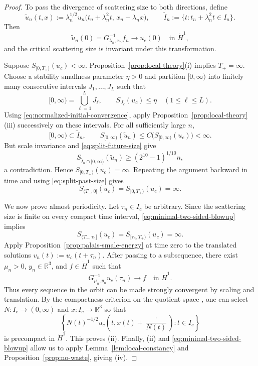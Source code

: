 \documentclass{interact}
\numberwithin{equation}{section}
\theoremstyle{plain}
\theoremstyle{definition}
\theoremstyle{remark}
\newcommand{\R}{\mathbb R}
\begin{document}
\begin{proof}
To pass the divergence of scattering size to both directions, define
\[
 \widetilde u_n(t,x)
 :=\lambda_n^{1/2}
 u_n\bigl(t_n+\lambda_n^2t,\,x_n+\lambda_n x\bigr),
 \qquad
 \widetilde I_n
 :=\{t:t_n+\lambda_n^2t\in I_n\}.
\]
Then
\begin{equation}\label{eq:normalized-initial-convergence}
 \widetilde u_n(0)=G_{\lambda_n,x_n}^{-1}f_n
 \longrightarrow u_c(0)
 \quad\text{in }\dot H^1,
\end{equation}
and the critical scattering size is invariant under this transformation.

Suppose $S_{[0,T_+)}(u_c)<\infty$. Proposition~\ref{prop:local-theory}(i) implies $T_+=\infty$. Choose a stability smallness parameter $\eta>0$ and partition $[0,\infty)$ into finitely many consecutive intervals $J_1,\dots,J_L$ such that
\[
 [0,\infty)=\bigcup_{\ell=1}^LJ_\ell,
 \qquad
 S_{J_\ell}(u_c)\le\eta
 \quad(1\le\ell\le L).
\]
Using \eqref{eq:normalized-initial-convergence}, apply Proposition~\ref{prop:local-theory}(iii) successively on these intervals. For all sufficiently large $n$,
\[
 [0,\infty)\subset\widetilde I_n,
 \qquad
 S_{[0,\infty)}(\widetilde u_n)
 \le C\bigl(S_{[0,\infty)}(u_c)\bigr)<\infty.
\]
But scale invariance and \eqref{eq:split-future-size} give
\[
 S_{\widetilde I_n\cap[0,\infty)}(\widetilde u_n)
 \ge(2^{10}-1)^{1/10}n,
\]
a contradiction. Hence $S_{[0,T_+)}(u_c)=\infty$. Repeating the argument backward in time and using \eqref{eq:split-past-size} gives
\begin{equation}\label{eq:minimal-two-sided-blowup}
 S_{(T_-,0]}(u_c)
 =S_{[0,T_+)}(u_c)
 =\infty.
\end{equation}

We now prove almost periodicity. Let $\tau_n\in I_c$ be arbitrary. Since the scattering size is finite on every compact time interval, \eqref{eq:minimal-two-sided-blowup} implies
\[
 S_{(T_-,\tau_n]}(u_c)
 =S_{[\tau_n,T_+)}(u_c)
 =\infty.
\]
Apply Proposition~\ref{prop:palais-smale-energy} at time zero to the translated solutions $v_n(t):=u_c(t+\tau_n)$. After passing to a subsequence, there exist $\mu_n>0$, $y_n\in\R^3$, and $f\in\dot H^1$ such that
\[
 G_{\mu_n,y_n}^{-1}u_c(\tau_n)
 \longrightarrow f
 \quad\text{in }\dot H^1.
\]
Thus every sequence in the orbit can be made strongly convergent by scaling and translation. By the compactness criterion on the quotient space \cite[Proposition~5.6 and Theorem~5.12]{KillipVisan2013}, one can select $N:I_c\to(0,\infty)$ and $x:I_c\to\R^3$ so that
\[
 \left\{
 N(t)^{-1/2}u_c\left(t,x(t)+\frac{\cdot}{N(t)}\right):
 t\in I_c
 \right\}
\]
is precompact in $\dot H^1$. This proves (ii). Finally, (ii) and \eqref{eq:minimal-two-sided-blowup} allow us to apply Lemma~\ref{lem:local-constancy} and Proposition~\ref{prop:no-waste}, giving (iv).
\end{proof}
\end{document}
